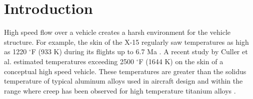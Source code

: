 \documentclass[conf]{new-aiaa}
\begin{document}
\section{Introduction}

High speed flow over a vehicle creates a harsh environment for 
the vehicle structure.
For example, the skin of the X-15 regularly saw temperatures
as high as 1220 $^{\circ}$F (933 K)
during its flights up to 6.7 Ma
\cite{ kordes_structureal_heating_experiencs_on_the_x15_airplane}.
A recent study by Culler et al.
\cite{ culler_impact_of_FTS_coupling_on_response_prediction_hypersonic_skin_panels}
estimated temperatures exceeding 2500 $^\circ$F (1644 K) 
on the skin of a conceptual high speed vehicle.
These temperatures are greater than the solidus 
temperature of typical aluminum alloys used in aircraft design
\cite{ SAE_metals_and_alloys_in_the_unified_numbering_system}
and within the range where creep has been observed for 
high temperature titanium alloys 
\cite{
  evans_effects_of_alpha_case_formation_on_creep_fracture_properties_of_the_high_temperature_titanium_alloy_IMI834,
  lavina_creep_behavior_of_Ti6Al4V_from_450C_to_600C}.
\end{document}
